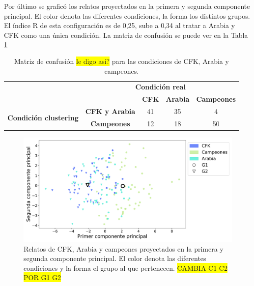 Por último se graficó los relatos proyectados en la primera y segunda componente principal. El color denota las diferentes condiciones, la forma los distintos grupos. El índice R de esta configuración es de 0,25, sube a 0,34 al tratar a Arabia y CFK como una única condición. La matriz de confusión se puede ver en la Tabla \ref{tab:confusion_matrix_CFKARcamp}


\begin{table}[htbp]
    \centering
    \begin{tabular}{|l|c|c|c|c|}
        \cline{2-5}
        \multicolumn{1}{|c|}{} & \multicolumn{4}{c|}{\textbf{Condición real}} \\
        \cline{2-5}
        \multicolumn{1}{|c|}{} & & \textbf{CFK} & \textbf{Arabia} & \textbf{Campeones} \\
        \hline
        \multirow{2}{*}{\textbf{Condición clustering}} & \textbf{CFK y Arabia} & 41 & 35 & 4 \\
        \cline{2-5}
        & \textbf{Campeones} & 12 & 18 & 50 \\
        \hline
    \end{tabular}
    \caption{Matriz de confusión \colorbox{yellow}{le digo asi?} para las condiciones de CFK, Arabia y campeones.}
    \label{tab:confusion_matrix_CFKARcamp}
\end{table}

\begin{figure}[h]
    \centering
    \includegraphics[width = 15cm]{figures/ch03/PCA_clustering/Primer tiempo/cfkArCamp_NOenespaciocosine_PC1vsPC2_markersclusters_colortemas.pdf} 
    \caption{Relatos de CFK, Arabia y campeones proyectados en la primera y segunda componente principal. El color denota las diferentes condiciones y la forma el grupo al que pertenecen. \colorbox{yellow}{CAMBIA C1 C2 POR G1 G2}}
\label{fig:cap3_PC1vsPC2cfkArCamp}
\end{figure}


